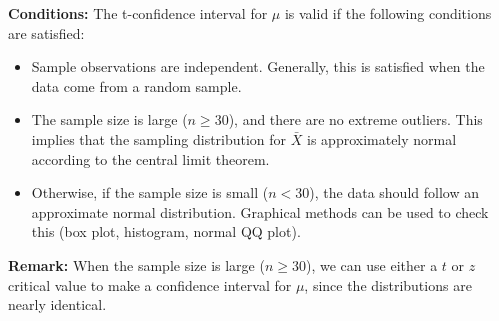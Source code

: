 \documentclass[fleqn, 12pt]{article}\usepackage[]{graphicx}\usepackage[]{color}
\begin{document}
\clearpage

\textbf{Conditions:}  The t-confidence interval for $\mu$ is valid if the following conditions are satisfied:
\begin{itemize}
\item Sample observations are independent.  Generally, this is satisfied when the data come from a random sample.
\item The sample size is large ($n \geq 30$), and there are no extreme outliers.  This implies that the sampling distribution for $\bar{X}$ is approximately normal according to the central limit theorem.
\item Otherwise, if the sample size is small ($n < 30$), the data should follow an approximate normal distribution.  Graphical methods can be used to check this (box plot, histogram, normal QQ plot).
\end{itemize}

\textbf{Remark:}  When the sample size is large ($n \geq 30$), we can use either a $t$ or $z$ critical value to make a confidence interval for $\mu$, since the distributions are nearly identical.\\

\end{document}
